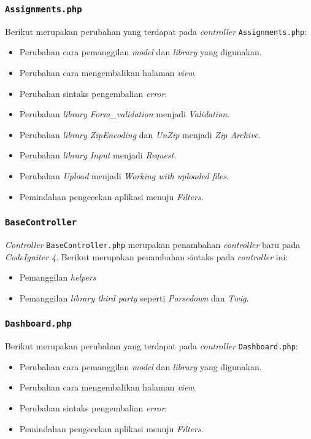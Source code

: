 \subsubsection{\texttt{Assignments.php}}
Berikut merupakan perubahan yang terdapat pada \textit{controller} \texttt{Assignments.php}:
\begin{itemize}
	\item Perubahan cara pemanggilan \textit{model} dan \textit{library} yang digunakan.
	\item Perubahan cara mengembalikan halaman \textit{view}.
	\item Perubahan sintaks pengembalian \textit{error}.
	\item Perubahan \textit{library Form\_validation} menjadi \textit{Validation}.
	\item Perubahan \textit{library ZipEncoding} dan \textit{UnZip} menjadi \textit{Zip Archive}.
	\item Perubahan \textit{library Input} menjadi \textit{Request}.
	\item Perubahan \textit{Upload} menjadi \textit{Working with uploaded files}.
	\item Pemindahan pengecekan aplikasi menuju \textit{Filters}.
\end{itemize}
\subsubsection{\texttt{BaseController}}
\textit{Controller} \texttt{BaseController.php} merupakan penambahan \textit{controller} baru pada \textit{CodeIgniter 4}. Berikut merupakan penambahan sintaks pada \textit{controller} ini:
\begin{itemize}
	\item Pemanggilan \textit{helpers}
	\item Pemanggilan \textit{library third party} seperti \textit{Parsedown} dan \textit{Twig}.
\end{itemize}

\subsubsection{\texttt{Dashboard.php}}
Berikut merupakan perubahan yang terdapat pada \textit{controller} \texttt{Dashboard.php}:
\begin{itemize}
	\item Perubahan cara pemanggilan \textit{model} dan \textit{library} yang digunakan.
	\item Perubahan cara mengembalikan halaman \textit{view}.
	\item Perubahan sintaks pengembalian \textit{error}.
	\item Pemindahan pengecekan aplikasi menuju \textit{Filters}.
\end{itemize}
